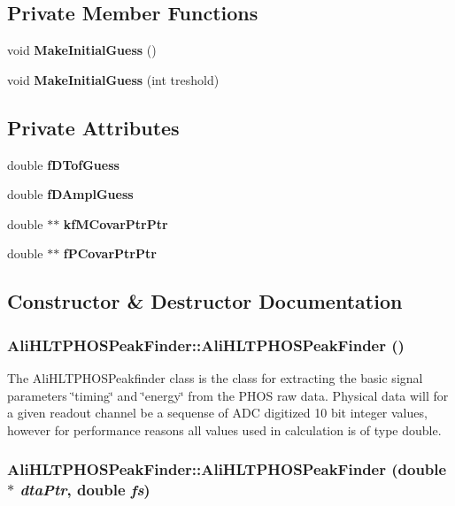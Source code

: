 \subsection*{Private Member Functions}
\begin{CompactItemize}
\item 
void {\bf Make\-Initial\-Guess} ()
\item 
void {\bf Make\-Initial\-Guess} (int treshold)
\end{CompactItemize}
\subsection*{Private Attributes}
\begin{CompactItemize}
\item 
double {\bf f\-DTof\-Guess}
\item 
double {\bf f\-DAmpl\-Guess}
\item 
double $\ast$$\ast$ {\bf kf\-MCovar\-Ptr\-Ptr}
\item 
double $\ast$$\ast$ {\bf f\-PCovar\-Ptr\-Ptr}
\end{CompactItemize}


\subsection{Constructor \& Destructor Documentation}
\subsubsection{\setlength{\rightskip}{0pt plus 5cm}Ali\-HLTPHOSPeak\-Finder::Ali\-HLTPHOSPeak\-Finder ()}\label{classAliHLTPHOSPeakFinder_a0}


The Ali\-HLTPHOSPeakfinder class is the class for extracting the basic signal parameters \char`\"{}timing\char`\"{} and \char`\"{}energy\char`\"{} from the PHOS raw data. Physical data will for a given readout channel be a sequense of ADC digitized 10 bit integer values, however for performance reasons all values used in calculation is of type double. 
\subsubsection{\setlength{\rightskip}{0pt plus 5cm}Ali\-HLTPHOSPeak\-Finder::Ali\-HLTPHOSPeak\-Finder (double $\ast$ {\em dta\-Ptr}, double {\em fs})}\label{classAliHLTPHOSPeakFinder_a1}


